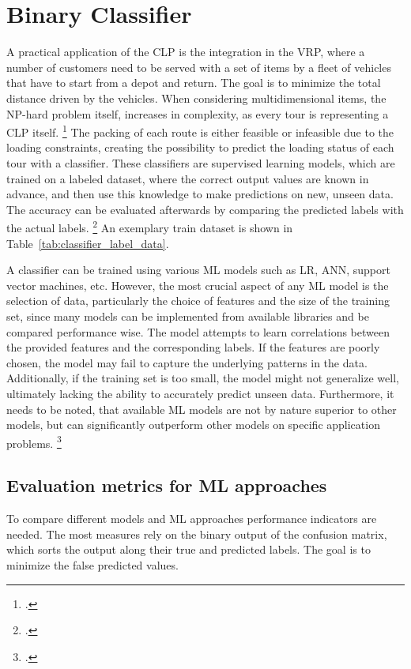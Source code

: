 \chapter{Binary Classifier}
\label{chap:classifier}

A practical application of the \gls{CLP} is the integration in the \gls{VRP}, where
a number of customers need to be served with a set of items by a fleet of vehicles that have
to start from a depot and return. The goal is to minimize the total distance driven
by the vehicles. When considering multidimensional items, the NP-hard problem itself,
increases in complexity, as every tour is representing a \gls{CLP} itself. \footcite[cf.][pp. 1--2]{tamke_branch-and-cut_2024}
The packing of each route is either feasible or infeasible due to the loading constraints,
creating the possibility to predict the loading status of each tour with a classifier.
These classifiers are supervised learning models, which are trained on a labeled dataset,
where the correct output values are known in advance, and then use this knowledge to
make predictions on new, unseen data. The accuracy can be evaluated afterwards by comparing
the predicted labels with the actual labels. \footcite[cf.][]{kotsiantis_supervised_2007}
An exemplary train dataset is shown in Table~\ref{tab:classifier_label_data}.



A classifier can be trained using various \gls{ML} models such as \gls{LR},
\gls{ANN}, support vector machines, etc. However, the most crucial aspect of any
\gls{ML} model is the selection of data, particularly the choice of features and
the size of the training set, since many models can be implemented from available
libraries and be compared performance wise. The model attempts to learn correlations between the provided features
and the corresponding labels. If the features are poorly chosen, the model may fail
to capture the underlying patterns in the data. Additionally, if the training set
is too small, the model might not generalize well, ultimately lacking the ability
to accurately predict unseen data. Furthermore, it needs to be noted, that available
\gls{ML} models are not by nature superior to other models, but can significantly outperform
other models on specific application problems. \footcite[cf.][pp. 250, 264]{kotsiantis_supervised_2007}


\section{Evaluation metrics for ML approaches}
\label{sec:classifier_objectives}
To compare different models and \gls{ML} approaches performance indicators are needed. The most
measures rely on the binary output of the confusion matrix, which sorts the output along
their true and predicted labels. The goal is to minimize the false predicted values.

